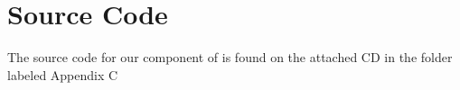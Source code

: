 
\chapter{Source Code}
The source code for our component of \system{} is found on the attached CD in the folder labeled Appendix C